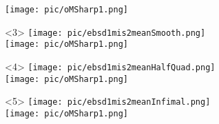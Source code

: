 \documentclass[comptress]{beamer}
\begin{document}
\begin{frame}[fragile]
\begin{overlayarea}{\textwidth}{\textheight}
\begin{columns}
\begin{column}{3.8cm}
\begin{onlyenv}
        \texttt{[image: pic/oMSharp1.png]}
      \end{onlyenv}
      \begin{onlyenv}<3>
        \texttt{[image: pic/ebsd1mis2meanSmooth.png]}\\
        \texttt{[image: pic/oMSharp1.png]}
      \end{onlyenv}
      \begin{onlyenv}<4>
        \texttt{[image: pic/ebsd1mis2meanHalfQuad.png]}\\
        \texttt{[image: pic/oMSharp1.png]}
      \end{onlyenv}
      \begin{onlyenv}<5>
        \texttt{[image: pic/ebsd1mis2meanInfimal.png]}\\
        \texttt{[image: pic/oMSharp1.png]}
      \end{onlyenv}
    \end{column}
  \end{columns}
    \end{overlayarea}
\end{frame}
\end{document}
